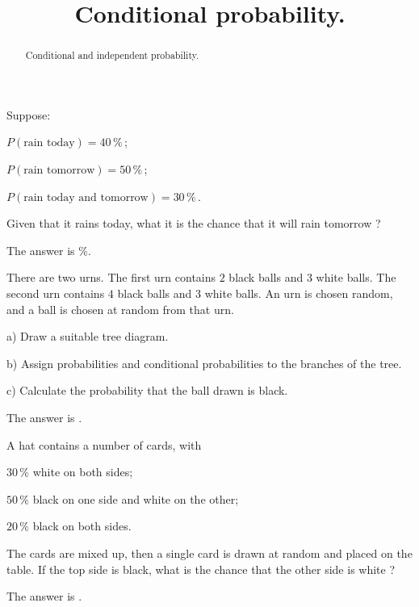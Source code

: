 \documentclass{ximera}
\title{Conditional probability.}
\begin{document}
\begin{abstract}
Conditional and independent probability.
\end{abstract}
\maketitle

\begin{question}
Suppose:

$P(\text{rain today})=40\,\%\,$; 

$P(\text{rain tomorrow})=50\,\%\,$; 

$P(\text{rain today and tomorrow})=30\,\%\,$.

Given that it rains today, what it is the chance that it will rain tomorrow ?
     \begin{solution}
           The answer is  $\%$.
     \end{solution}
\end{question}

\begin{question}
There are two urns. The first urn contains $2$ black balls and $3$ white balls. The second urn contains $4$ black balls and $3$ white balls. An urn is chosen random, and a ball is chosen at random from that urn.

a) Draw a suitable tree diagram.

b) Assign probabilities and conditional probabilities to the branches of the tree.

c) Calculate the probability that the ball drawn is black.
     \begin{solution}
           The answer is .
     \end{solution}
\end{question}

\begin{question}
A hat contains a number of cards, with

$30\,\%$ white on both sides;

$50\,\%$ black on one side and white on the other;

$20\,\%$ black on both sides.

The cards are mixed up, then a single card is drawn at random and placed on the table. If the top side is black, what is the chance that the other side is white ?
     \begin{solution}
           The answer is .
     \end{solution}
\end{question}
\end{document}
